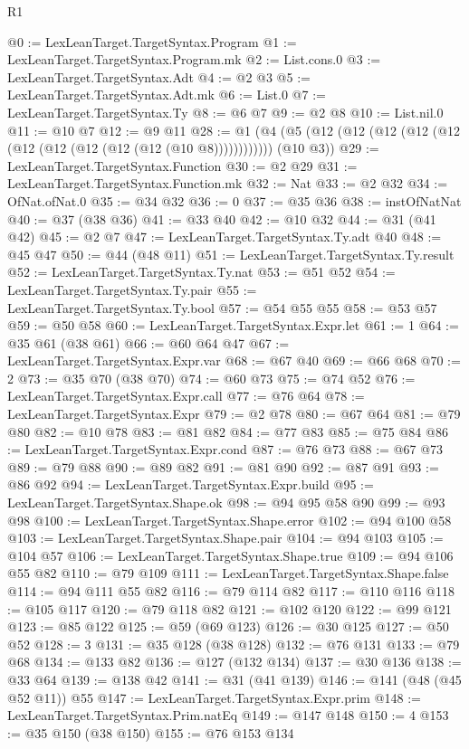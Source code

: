 \begin{lexlean}{R1}
\begin{coremodule}
@0 := LexLeanTarget.TargetSyntax.Program
@1 := LexLeanTarget.TargetSyntax.Program.mk
@2 := List.cons.{0}
@3 := LexLeanTarget.TargetSyntax.Adt
@4 := @2 @3
@5 := LexLeanTarget.TargetSyntax.Adt.mk
@6 := List.{0}
@7 := LexLeanTarget.TargetSyntax.Ty
@8 := @6 @7
@9 := @2 @8
@10 := List.nil.{0}
@11 := @10 @7
@12 := @9 @11
@28 := @1 (@4 (@5 (@12 (@12 (@12 (@12 (@12 (@12 (@12 (@12 (@12 (@12 (@10 @8)))))))))))) (@10 @3))
@29 := LexLeanTarget.TargetSyntax.Function
@30 := @2 @29
@31 := LexLeanTarget.TargetSyntax.Function.mk
@32 := Nat
@33 := @2 @32
@34 := OfNat.ofNat.{0}
@35 := @34 @32
@36 := 0
@37 := @35 @36
@38 := instOfNatNat
@40 := @37 (@38 @36)
@41 := @33 @40
@42 := @10 @32
@44 := @31 (@41 @42)
@45 := @2 @7
@47 := LexLeanTarget.TargetSyntax.Ty.adt @40
@48 := @45 @47
@50 := @44 (@48 @11)
@51 := LexLeanTarget.TargetSyntax.Ty.result
@52 := LexLeanTarget.TargetSyntax.Ty.nat
@53 := @51 @52
@54 := LexLeanTarget.TargetSyntax.Ty.pair
@55 := LexLeanTarget.TargetSyntax.Ty.bool
@57 := @54 @55 @55
@58 := @53 @57
@59 := @50 @58
@60 := LexLeanTarget.TargetSyntax.Expr.let
@61 := 1
@64 := @35 @61 (@38 @61)
@66 := @60 @64 @47
@67 := LexLeanTarget.TargetSyntax.Expr.var
@68 := @67 @40
@69 := @66 @68
@70 := 2
@73 := @35 @70 (@38 @70)
@74 := @60 @73
@75 := @74 @52
@76 := LexLeanTarget.TargetSyntax.Expr.call
@77 := @76 @64
@78 := LexLeanTarget.TargetSyntax.Expr
@79 := @2 @78
@80 := @67 @64
@81 := @79 @80
@82 := @10 @78
@83 := @81 @82
@84 := @77 @83
@85 := @75 @84
@86 := LexLeanTarget.TargetSyntax.Expr.cond
@87 := @76 @73
@88 := @67 @73
@89 := @79 @88
@90 := @89 @82
@91 := @81 @90
@92 := @87 @91
@93 := @86 @92
@94 := LexLeanTarget.TargetSyntax.Expr.build
@95 := LexLeanTarget.TargetSyntax.Shape.ok
@98 := @94 @95 @58 @90
@99 := @93 @98
@100 := LexLeanTarget.TargetSyntax.Shape.error
@102 := @94 @100 @58
@103 := LexLeanTarget.TargetSyntax.Shape.pair
@104 := @94 @103
@105 := @104 @57
@106 := LexLeanTarget.TargetSyntax.Shape.true
@109 := @94 @106 @55 @82
@110 := @79 @109
@111 := LexLeanTarget.TargetSyntax.Shape.false
@114 := @94 @111 @55 @82
@116 := @79 @114 @82
@117 := @110 @116
@118 := @105 @117
@120 := @79 @118 @82
@121 := @102 @120
@122 := @99 @121
@123 := @85 @122
@125 := @59 (@69 @123)
@126 := @30 @125
@127 := @50 @52
@128 := 3
@131 := @35 @128 (@38 @128)
@132 := @76 @131
@133 := @79 @68
@134 := @133 @82
@136 := @127 (@132 @134)
@137 := @30 @136
@138 := @33 @64
@139 := @138 @42
@141 := @31 (@41 @139)
@146 := @141 (@48 (@45 @52 @11)) @55
@147 := LexLeanTarget.TargetSyntax.Expr.prim
@148 := LexLeanTarget.TargetSyntax.Prim.natEq
@149 := @147 @148
@150 := 4
@153 := @35 @150 (@38 @150)
@155 := @76 @153 @134

\end{coremodule}
\end{lexlean}
